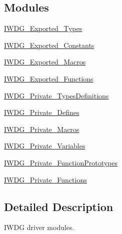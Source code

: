 \subsection*{Modules}
\begin{DoxyCompactItemize}
\item 
\hyperlink{group___i_w_d_g___exported___types}{I\+W\+D\+G\+\_\+\+Exported\+\_\+\+Types}
\item 
\hyperlink{group___i_w_d_g___exported___constants}{I\+W\+D\+G\+\_\+\+Exported\+\_\+\+Constants}
\item 
\hyperlink{group___i_w_d_g___exported___macros}{I\+W\+D\+G\+\_\+\+Exported\+\_\+\+Macros}
\item 
\hyperlink{group___i_w_d_g___exported___functions}{I\+W\+D\+G\+\_\+\+Exported\+\_\+\+Functions}
\item 
\hyperlink{group___i_w_d_g___private___types_definitions}{I\+W\+D\+G\+\_\+\+Private\+\_\+\+Types\+Definitions}
\item 
\hyperlink{group___i_w_d_g___private___defines}{I\+W\+D\+G\+\_\+\+Private\+\_\+\+Defines}
\item 
\hyperlink{group___i_w_d_g___private___macros}{I\+W\+D\+G\+\_\+\+Private\+\_\+\+Macros}
\item 
\hyperlink{group___i_w_d_g___private___variables}{I\+W\+D\+G\+\_\+\+Private\+\_\+\+Variables}
\item 
\hyperlink{group___i_w_d_g___private___function_prototypes}{I\+W\+D\+G\+\_\+\+Private\+\_\+\+Function\+Prototypes}
\item 
\hyperlink{group___i_w_d_g___private___functions}{I\+W\+D\+G\+\_\+\+Private\+\_\+\+Functions}
\end{DoxyCompactItemize}


\subsection{Detailed Description}
I\+W\+DG driver modules. 

